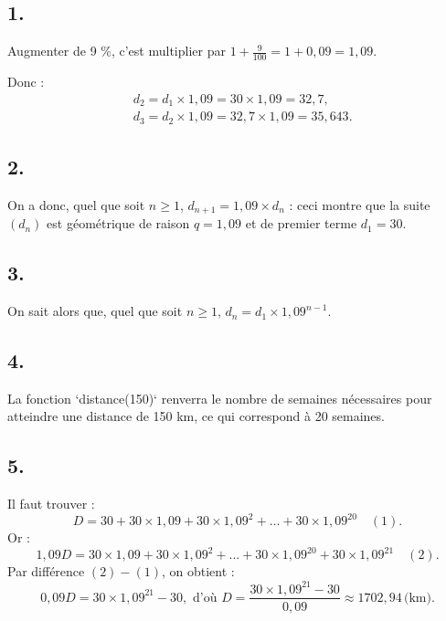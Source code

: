 \subsection*{1.}

Augmenter de 9 \%, c'est multiplier par \(1 + \frac{9}{100} = 1 + 0{,}09 = 1{,}09\).

Donc :
\begin{align*}
&d_2 = d_1 \times 1{,}09 = 30 \times 1{,}09 = 32{,}7, \\
&d_3 = d_2 \times 1{,}09 = 32{,}7 \times 1{,}09 = 35{,}643.
\end{align*}

\subsection*{2.}

On a donc, quel que soit \( n \geqslant 1 \), \(d_{n+1} = 1{,}09 \times d_n\) : ceci montre que la suite \( (d_n) \) est géométrique de raison \(q = 1{,}09\) et de premier terme \(d_1 = 30\).

\subsection*{3.}

On sait alors que, quel que soit \(n \geqslant 1\), \( d_n = d_1 \times 1{,}09^{n-1} \).

\subsection*{4.}

La fonction `distance(150)` renverra le nombre de semaines nécessaires pour atteindre une distance de 150 km, ce qui correspond à 20 semaines.

\subsection*{5.}

Il faut trouver :
\[
D = 30 + 30 \times 1{,}09 + 30 \times 1{,}09^2 + \dots + 30 \times 1{,}09^{20} \quad (1).
\]
Or :
\[
1{,}09D = 30 \times 1{,}09 + 30 \times 1{,}09^2 + \dots + 30 \times 1{,}09^{20} + 30 \times 1{,}09^{21} \quad (2).
\]
Par différence \((2) - (1) \), on obtient :
\[
0{,}09D = 30 \times 1{,}09^{21} - 30, \text{ d'où } D = \frac{30 \times 1{,}09^{21} - 30}{0{,}09} \approx 1702{,}94 \, \text{(km)}.
\]
